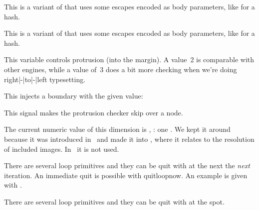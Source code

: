 \stopoldprimitive

\startnewprimitive[title={\prm {protecteddetokenize}}]

This is a variant of  that uses some escapes encoded as
body parameters, like  for a hash.

\stopnewprimitive

\startnewprimitive[title={\prm {protectedexpandeddetokenize}}]

This is a variant of  that uses some escapes encoded as
body parameters, like  for a hash.

\stopnewprimitive

\startnewprimitive[title={\prm {protrudechars}}]

This variable controls protrusion (into the margin). A value~2 is comparable with
other engines, while a value of~3 does a bit more checking when we're doing
right|-|to|-|left typesetting.

\stopnewprimitive

\startnewprimitive[title={\prm {protrusionboundary}}]

This injects a boundary with the given value:


This signal makes the protrusion checker skip over a node.

\stopnewprimitive

\startnewprimitive[title={\prm {pxdimen}}]

The current numeric value of this dimension is \tointeger \pxdimen, \todimension
\pxdimen: one . We kept it around because it was introduced in \PDFTEX\
and made it into \LUATEX, where it relates to the resolution of included images.
In \CONTEXT\ it is not used.

\stopnewprimitive

\startnewprimitive[title={\prm {quitloop}}]

There are several loop primitives and they can be quit with  at
the next the {\em next} iteration. An immediate quit is possible with \prm
{quitloopnow}. An example is given with \prm {localcontrolledloop}.

\stopnewprimitive

\startnewprimitive[title={\prm {quitloopnow}}]

There are several loop primitives and they can be quit with 
at the spot.


